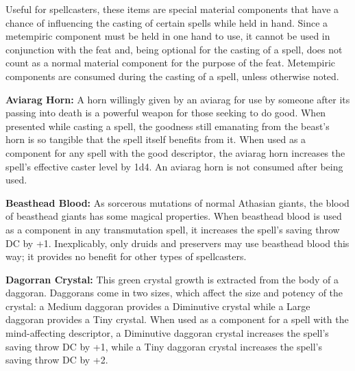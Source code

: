 Useful for spellcasters, these items are special material components that have a chance of influencing the casting of certain spells while held in hand. Since a metempiric component must be held in one hand to use, it cannot be used in conjunction with the  feat and, being optional for the casting of a spell, does not count as a normal material component for the purpose of the  feat. Metempiric components are consumed during the casting of a spell, unless otherwise noted.


\textbf{Aviarag Horn:} A horn willingly given by an aviarag for use by someone after its passing into death is a powerful weapon for those seeking to do good. When presented while casting a spell, the goodness still emanating from the beast's horn is so tangible that the spell itself benefits from it. When used as a component for any spell with the good descriptor, the aviarag horn increases the spell's effective caster level by 1d4. An aviarag horn is not consumed after being used.

\textbf{Beasthead Blood:} As sorcerous mutations of normal Athasian giants, the blood of beasthead giants has some magical properties. When beasthead blood is used as a component in any transmutation spell, it increases the spell's saving throw DC by +1. Inexplicably, only druids and preservers may use beasthead blood this way; it provides no benefit for other types of spellcasters.

\textbf{Dagorran Crystal:} This green crystal growth is extracted from the body of a daggoran. Daggorans come in two sizes, which affect the size and potency of the crystal: a Medium daggoran provides a Diminutive crystal while a Large daggoran provides a Tiny crystal. When used as a component for a spell with the mind-affecting descriptor, a Diminutive daggoran crystal increases the spell's saving throw DC by +1, while a Tiny daggoran crystal increases the spell's saving throw DC by +2.


